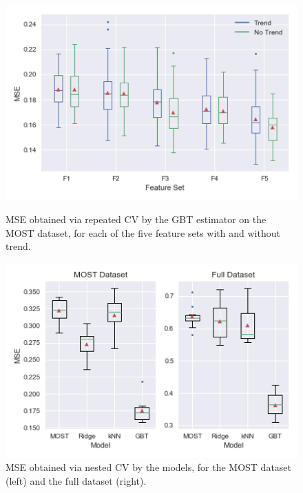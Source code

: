 \documentclass[a4paper,11pt]{kth-mag}
\begin{document}
\begin{figure}
    \centering
    \begin{minipage}[t]{0.49\textwidth}
        \centering
        \includegraphics[width=\textwidth]{images/fset_comparison}
        \caption{MSE obtained via repeated CV by the GBT estimator on the MOST dataset, for each of the five feature sets with and without trend.}
        \label{fig:fset_comparison}
    \end{minipage}
    \hfill
    \begin{minipage}[t]{0.49\textwidth}
        \centering
        \includegraphics[width=\textwidth]{images/baseline_comparison}
        \caption{MSE obtained via nested CV by the models, for the MOST dataset (left) and the full dataset (right).}
        \label{fig:baseline_comparison}
    \end{minipage}
\end{figure}
\end{document}
